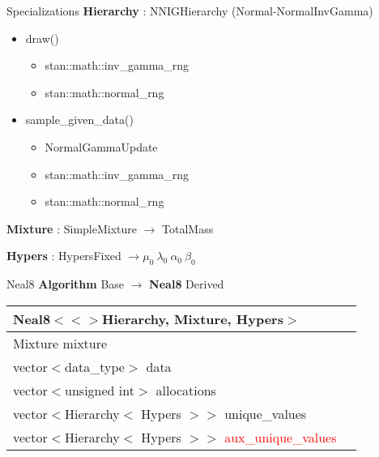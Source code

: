 \begin{frame}{Specializations}
\textbf{Hierarchy} : NNIGHierarchy (Normal-NormalInvGamma)
	\begin{itemize}
		\item draw()
		\begin{itemize}
			\item stan::math::inv\_gamma\_rng
			\item stan::math::normal\_rng
		\end{itemize}
		\item sample\_given\_data()
		\begin{itemize}
			\item NormalGammaUpdate
			\item stan::math::inv\_gamma\_rng
			\item stan::math::normal\_rng
		\end{itemize}
	\end{itemize}
\textbf{Mixture} : SimpleMixture $ \rightarrow$ TotalMass

\textbf{Hypers} : HypersFixed $ \rightarrow \mu_0 \ \lambda_0 \ \alpha_0 \ \beta_0 $

\end{frame}

\begin{frame}{Neal8}
 \textbf{Algorithm} Base $\rightarrow$ \textbf{Neal8} Derived

\begin{center}
\begin{tabular}{ | l | c| } 
\hline
 Neal8$<<>$Hierarchy, Mixture, Hypers$>$ \\
\hline
 Mixture mixture\\
 vector$<$data\_type$>$ data  \\ 
 vector$<$unsigned int$>$ allocations  \\
 vector$<$Hierarchy$<$ Hypers $>>$ unique\_values \\
 vector$<$Hierarchy$<$ Hypers $>>$ \textcolor{red}{aux\_unique\_values} \\
\hline
\end{tabular}
\end{center}

\end{frame}

